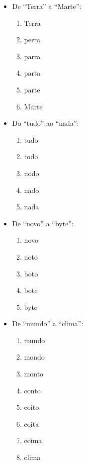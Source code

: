 \documentclass[portuguese,11pt,a4paper,titlepage]{article}
\begin{document}
\begin{multicols}{2}
\begin{itemize}
\item De ``Terra'' a ``Marte'':
	\begin{enumerate}
		\item Terra
		\item perra
		\item parra
		\item parta
		\item parte
		\item Marte
	\end{enumerate}
\item Do ``tudo'' ao ``nada'':
	\begin{enumerate}
		\item tudo
		\item todo
		\item nodo
		\item nado
		\item nada
	\end{enumerate}
\vfill\null
\columnbreak
\item De ``novo'' a ``byte'':
	\begin{enumerate}
		\item novo
		\item noto
		\item boto
		\item bote
		\item byte
	\end{enumerate}
\item De ``mundo'' a ``clima'':
	\begin{enumerate}
		\item mundo
		\item mondo
		\item monto
		\item conto
		\item coito
		\item coita
		\item coima
		\item clima
	\end{enumerate}
\end{itemize}
\end{multicols}
\pagebreak
\end{document}
